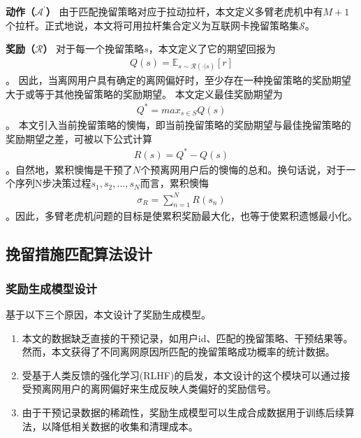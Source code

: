 \par
\textbf{动作（$\mathcal{A}^{'}$）} %
由于匹配挽留策略对应于拉动拉杆，本文定义多臂老虎机中有$M+1$个拉杆。正式地说，本文将可用拉杆集合定义为互联网卡挽留策略集$\mathcal{S}$。
\par
\textbf{奖励（$\mathcal{R}$）} %
对于每一个挽留策略$s$，本文定义了它的期望回报为
\begin{equation}
	\begin{aligned}
		Q(s) = \mathbb{E}_{s \sim \mathcal{R}(\cdot|s)} [r]
	\end{aligned}
	\label{Eq:Reward-Expectation}
\end{equation} 
。
因此，当离网用户具有确定的离网偏好时，至少存在一种挽留策略的奖励期望大于或等于其他挽留策略的奖励期望。
本文定义最佳奖励期望为
\begin{equation}
	\begin{aligned}
		Q^{*} = max_{s \in S}Q(s)
	\end{aligned}
	\label{Eq:Best-Reward-Expectation}
\end{equation}	
。
本文引入当前挽留策略的懊悔，即当前挽留策略的奖励期望与最佳挽留策略的奖励期望之差，可被以下公式计算
\begin{equation}
	\begin{aligned}
		R(s) = Q^{*} - Q(s)
	\end{aligned}
	\label{Eq:Regret}
\end{equation}	  
。自然地，累积懊悔是干预了$N$个预离网用户后的懊悔的总和。换句话说，对于一个序列N步决策过程${s_{1}, s_{2}, ..., s_{N}}$而言，累积懊悔
\begin{equation}
	\begin{aligned}
		\sigma_{R} = \sum_{n=1}^{N} R(s_{n})
	\end{aligned}
	\label{Eq:Cumulative-Regrets}
\end{equation}	   
。因此，多臂老虎机问题的目标是使累积奖励最大化，也等于使累积遗憾最小化。
\par	


\subsection{挽留措施匹配算法设计}

\subsubsection{奖励生成模型设计}


基于以下三个原因，本文设计了奖励生成模型。
\begin{enumerate}	
	\item 本文的数据缺乏直接的干预记录，如用户id、匹配的挽留策略、干预结果等。然而，本文获得了不同离网原因所匹配的挽留策略成功概率的统计数据。
	\item 受基于人类反馈的强化学习(RLHF)的启发，本文设计的这个模块可以通过接受预离网用户的离网偏好来生成反映人类偏好的奖励信号。
	\item 由于干预记录数据的稀疏性，奖励生成模型可以生成合成数据用于训练后续算法，以降低相关数据的收集和清理成本。
\end{enumerate}
\par

